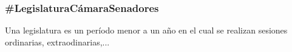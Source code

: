\subsubsection{\#LegislaturaCámaraSenadores}

Una legislatura es un período menor a un año en el cual se realizan
sesiones ordinarias, extraodinarias,...

\begin{description}
  
\end{description}
